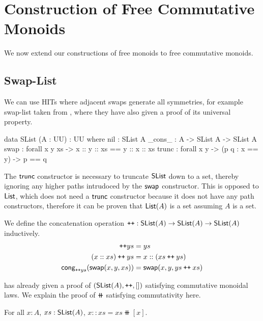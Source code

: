 \section{Construction of Free Commutative Monoids}
\label{sec:commutative-monoids}

We now extend our constructions of free monoids to free commutative monoids.

\subsection{Swap-List}
We can use HITs where adjacent swaps generate all symmetries,
for example swap-list taken from \cite{choudhuryFreeCommutativeMonoids2023}, where they have
also given a proof of its universal property.

\begin{code}
data SList (A : UU) : UU where
  nil : SList A
  _cons_ : A -> SList A -> SList A
  swap : forall x y xs -> x :: y :: xs == y :: x :: xs 
  trunc : forall x y -> (p q : x == y) -> p == q
\end{code}

The $\operatorname{\mathsf{trunc}}$ constructor is necessary to truncate $\operatorname{\mathsf{SList}}$ down to a set,
thereby ignoring any higher paths intrudoced by the $\operatorname{\mathsf{swap}}$ constructor.
This is opposed to $\operatorname{\mathsf{List}}$, which does not need a $\operatorname{\mathsf{trunc}}$ constructor
because it does not have any path constructors, therefore it can be proven that $\operatorname{\mathsf{List}}(A)$
is a set assuming $A$ is a set.

\begin{definition}[Concatenation]
    We define the concatenation operation $\mathbin{\text{\ttfamily\upshape ++}} : \operatorname{\mathsf{SList}}(A) \to \operatorname{\mathsf{SList}}(A) \to \operatorname{\mathsf{SList}}(A)$
    inductively.
    \begin{align*}
        [] \doubleplus ys & = ys \\
        (x :: xs) \doubleplus ys & = x :: (xs \doubleplus ys) \\
        \term{cong}_{\doubleplus ys}(\term{swap}(x, y, xs)) & = \term{swap}(x, y, ys \doubleplus xs)
    \end{align*}
\end{definition}

\cite{choudhuryFreeCommutativeMonoids2023} has already given a proof of $(\operatorname{\mathsf{SList}}(A), \mathbin{\text{\ttfamily\upshape ++}}, [])$
satisfying commutative monoidal laws. We explain the proof of $\doubleplus$ satisfying commutativity here.

\begin{lemma}\label{slist:cons}
    For all $x : A$, $xs : \operatorname{\mathsf{SList}}(A)$, $x :: xs = xs \doubleplus [ x ]$.
\end{lemma}

